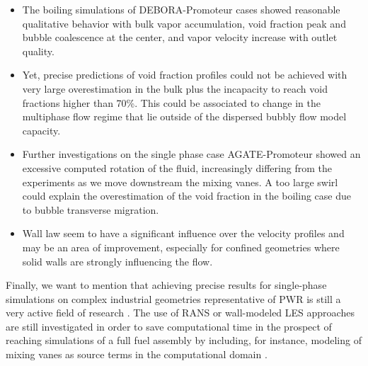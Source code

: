 \begin{itemize}
\item The boiling simulations of DEBORA-Promoteur cases showed reasonable qualitative behavior with bulk vapor accumulation, void fraction peak and bubble coalescence at the center, and vapor velocity increase with outlet quality.

\item Yet, precise predictions of void fraction profiles could not be achieved with very large overestimation in the bulk plus the incapacity to reach void fractions higher than 70\%. This could be associated to change in the multiphase flow regime that lie outside of the dispersed bubbly flow model capacity.

\item Further investigations on the single phase case AGATE-Promoteur showed an excessive computed rotation of the fluid, increasingly differing from the experiments as we move downstream the mixing vanes. A too large swirl could explain the overestimation of the void fraction in the boiling case due to bubble transverse migration.

\item Wall law seem to have a significant influence over the velocity profiles and may be an area of improvement, especially for confined geometries where solid walls are strongly influencing the flow.
\end{itemize}


Finally, we want to mention that achieving precise results for single-phase simulations on complex industrial geometries representative of PWR is still a very active field of research \cite{lee_synthesis_2014}. The use of RANS \cite{benhamadouche_use_2017} or wall-modeled LES \cite{gauffre_wall-modeled_2020} approaches are still investigated in order to save computational time in the prospect of reaching simulations of a full fuel assembly by including, for instance, modeling of mixing vanes as source terms in the computational domain \cite{capone_source_2016}.


